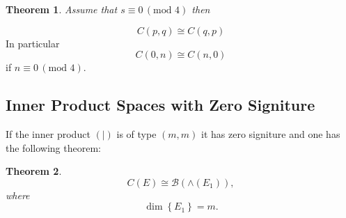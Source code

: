 \documentclass[aps,preprint]{revtex4}%
\newtheorem{theorem}{Theorem}
\begin{document}
\begin{theorem}
Assume that $s\equiv0\,\left(  \text{mod }4\right)  $ then
\end{theorem}

%

\begin{equation}
C\left(  p,q\right)  \cong C\left(  q,p\right)
\end{equation}
In particular
\begin{equation}
C\left(  0,n\right)  \cong C\left(  n,0\right)
\end{equation}
if $n\equiv0\,\left(  \text{mod }4\right)  .$

\subsection{Inner Product Spaces with Zero Signiture}

If the inner product $\left(  \left.  {}\right\vert \right)  $ is of type
$\left(  m,m\right)  $ it has zero signiture and one has the following theorem:

\begin{theorem}%
\begin{equation}
C\left(  E\right)  \cong\mathcal{B}\left(  \wedge\left(  E_{1}\right)
\right)  ,
\end{equation}
where
\begin{equation}
\dim\left\{  E_{1}\right\}  =m.
\end{equation}

\end{theorem}
\end{document}
